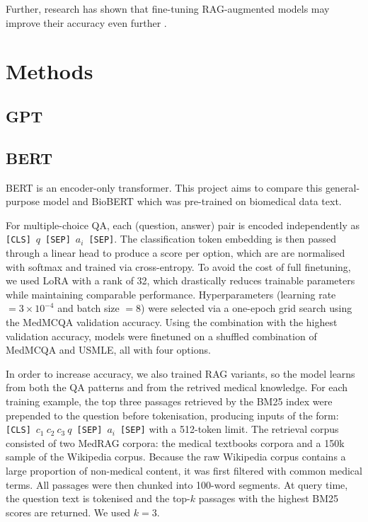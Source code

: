 \documentclass{article}
\begin{document}
Further, research has shown that fine-tuning RAG-augmented models may improve their accuracy even further \cite{hassan2025optimizingmedicalquestionansweringsystems}.

\section{Methods}

\subsection{GPT}

\subsection{BERT}
BERT \cite{devlin2019bertpretrainingdeepbidirectional} is an encoder-only transformer. This project aims to compare this general-purpose model and BioBERT \cite{Lee_2019} which was pre-trained on biomedical data text.

For multiple-choice QA, each (question, answer) pair is encoded independently as \texttt{[CLS]}\ $q$\ \texttt{[SEP]}\ $a_i$\ \texttt{[SEP]}. The classification token embedding is then passed through a linear head to produce a score per option, which are are normalised with softmax and trained via cross-entropy. To avoid the cost of full finetuning, we used LoRA \cite{hu2021loralowrankadaptationlarge} with a rank of 32, which drastically reduces trainable parameters while maintaining comparable performance. Hyperparameters (learning rate $=3\times10^{-4}$ and batch size $=8$) were selected via a one-epoch grid search using the MedMCQA validation accuracy. Using the combination with the highest validation accuracy, models were finetuned on a shuffled combination of MedMCQA and USMLE, all with four options.

In order to increase accuracy, we also trained RAG \cite{lewis2021retrievalaugmentedgenerationknowledgeintensivenlp} variants, so the model learns from both the QA patterns and from the retrived medical knowledge. For each training example, the top three passages retrieved by the BM25 index \cite{lewis2021retrievalaugmentedgenerationknowledgeintensivenlp} were prepended to the question before tokenisation, producing inputs of the form: \texttt{[CLS]}\ $c_1\ c_2\ c_3\ q$\ \texttt{[SEP]}\ $a_i$\ \texttt{[SEP]} with a 512-token limit. The retrieval corpus consisted of two MedRAG corpora: the medical textbooks corpora and a 150k sample of the Wikipedia corpus. Because the raw Wikipedia corpus contains a large proportion of non-medical content, it was first filtered with common medical terms. All passages were then chunked into 100-word segments. At query time, the question text is tokenised and the top-$k$ passages with the highest BM25 scores are returned. We used $k=3$.
\end{document}
